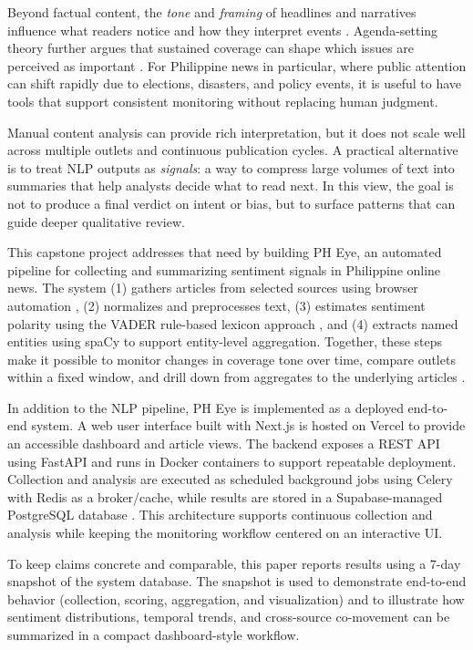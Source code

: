 \documentclass[sigconf, nonacm]{acmart}
\begin{document}
Beyond factual content, the \emph{tone} and \emph{framing} of headlines and narratives influence what readers notice and how they interpret events \cite{entman1993framing}. Agenda-setting theory further argues that sustained coverage can shape which issues are perceived as important \cite{mccombs1972agenda}. For Philippine news in particular, where public attention can shift rapidly due to elections, disasters, and policy events, it is useful to have tools that support consistent monitoring without replacing human judgment.

Manual content analysis can provide rich interpretation, but it does not scale well across multiple outlets and continuous publication cycles. A practical alternative is to treat NLP outputs as \emph{signals}: a way to compress large volumes of text into summaries that help analysts decide what to read next. In this view, the goal is not to produce a final verdict on intent or bias, but to surface patterns that can guide deeper qualitative review.

This capstone project addresses that need by building PH Eye, an automated pipeline for collecting and summarizing sentiment signals in Philippine online news. The system (1) gathers articles from selected sources using browser automation \cite{playwright}, (2) normalizes and preprocesses text, (3) estimates sentiment polarity using the VADER rule-based lexicon approach \cite{hutto2014vader}, and (4) extracts named entities using spaCy \cite{spacy} to support entity-level aggregation. Together, these steps make it possible to monitor changes in coverage tone over time, compare outlets within a fixed window, and drill down from aggregates to the underlying articles \cite{pang2008opinionmining,liu2012sentiment}.

In addition to the NLP pipeline, PH Eye is implemented as a deployed end-to-end system. A web user interface built with Next.js \cite{nextjs} is hosted on Vercel \cite{vercel} to provide an accessible dashboard and article views. The backend exposes a REST API using FastAPI \cite{fastapi} and runs in Docker containers \cite{docker} to support repeatable deployment. Collection and analysis are executed as scheduled background jobs using Celery \cite{celery} with Redis \cite{redis} as a broker/cache, while results are stored in a Supabase-managed PostgreSQL database \cite{supabase,postgresql}. This architecture supports continuous collection and analysis while keeping the monitoring workflow centered on an interactive UI.

To keep claims concrete and comparable, this paper reports results using a 7-day snapshot of the system database. The snapshot is used to demonstrate end-to-end behavior (collection, scoring, aggregation, and visualization) and to illustrate how sentiment distributions, temporal trends, and cross-source co-movement can be summarized in a compact dashboard-style workflow.
\end{document}
